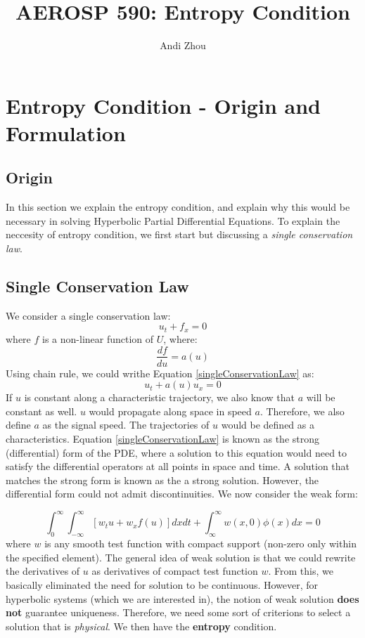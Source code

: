 \documentclass[a4paper]{article}
\title{AEROSP 590: Entropy Condition}
\author{Andi Zhou}
\begin{document}
\maketitle

\section{Entropy Condition - Origin and Formulation}
\subsection{Origin}
In this section we explain the entropy condition, and explain why this would be necessary in solving Hyperbolic Partial Differential Equations. To explain the neccesity of entropy condition, we first start but discussing a \textit{single conservation law}.
\subsection{Single Conservation Law}
We consider a single conservation law:
\begin{equation} \label{singleConservationLaw}
    u_t + f_x = 0
\end{equation}
where $f$ is a non-linear function of $U$, where:
\begin{equation}
    \frac{df}{du} = a(u)
\end{equation}
Using chain rule, we could writhe Equation \ref{singleConservationLaw} as:
\begin{equation}
    u_t + a(u)u_x = 0
\end{equation}
If $u$ is constant along a characteristic trajectory, we also know that $a$ will be constant as well. $u$ would propagate along space in speed $a$. Therefore, we also define $a$ as the signal speed. The trajectories of $u$ would be defined as a characteristics. Equation \ref{singleConservationLaw} is known as the strong (differential) form of the PDE, where a solution to this equation would need to satisfy the differential operators at all points in space and time. A solution that matches the strong form is known as the a strong solution. However, the differential form could not admit discontinuities. We now consider the weak form:

\begin{equation}
    \int_{0}^{\infty} \int_{-\infty}^{\infty} \left[w_t u + w_x f(u) \right] dx dt + \int_{\infty}^\infty w(x,0) \phi(x) dx = 0
\end{equation}
where $w$ is any smooth test function with compact support (non-zero only within the specified element). The general idea of weak solution is that we could rewrite the derivatives of $u$ as derivatives of compact test function $w$. From this, we basically eliminated the need for solution to be continuous. However, for hyperbolic systems (which we are interested in), the notion of weak solution \textbf{does not} guarantee uniqueness. Therefore, we need some sort of criterions to select a solution that is \textit{physical}. We then have the \textbf{entropy} condition. 
\end{document}
